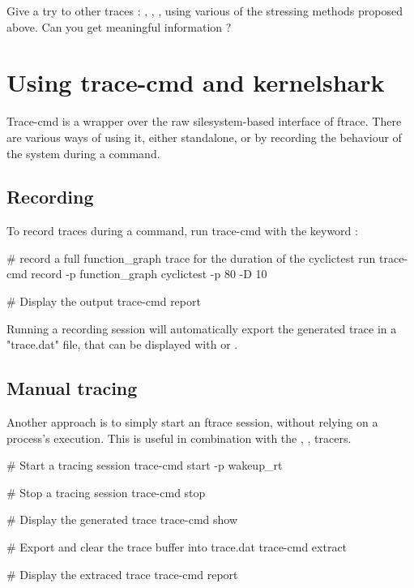 Give a try to other traces : , , ,
using various of the stressing methods proposed above. Can you get meaningful information ?

\section{Using trace-cmd and kernelshark}

Trace-cmd is a wrapper over the raw silesystem-based interface of ftrace. There
are various ways of using it, either standalone, or by recording the behaviour
of the system during a command.

\subsection{Recording}

To record traces during a command, run trace-cmd with the  keyword :

\begin{bashinput}
# record a full function_graph trace for the duration of the cyclictest run
trace-cmd record -p function_graph cyclictest -p 80 -D 10

# Display the output
trace-cmd report
\end{bashinput}

Running a recording session will automatically export the generated trace in a
"trace.dat" file, that can be displayed with  or .

\subsection{Manual tracing}

Another approach is to simply start an ftrace session, without relying on a process's
execution. This is useful in combination with the , ,  tracers.

\begin{bashinput}
	# Start a tracing session
	trace-cmd start -p wakeup_rt

	# Stop a tracing session
	trace-cmd stop

	# Display the generated trace
	trace-cmd show

	# Export and clear the trace buffer into trace.dat
	trace-cmd extract

	# Display the extraced trace
	trace-cmd report
\end{bashinput}

